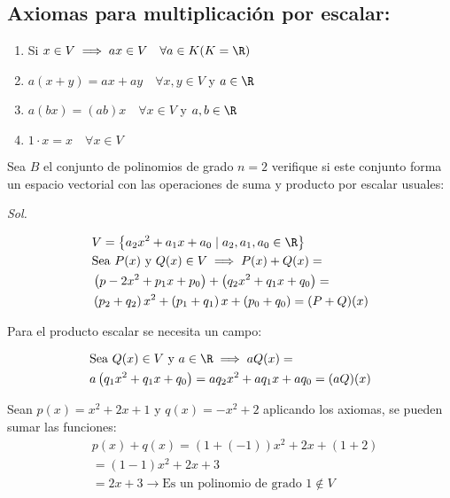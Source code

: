 \subsection{Axiomas para multiplicación por escalar:}

\begin{enumerate}
	\item Si $x\in V\implies ax\in V \quad \forall a\in K (K=\R)$
	\item $a(x+y)=ax+ay\quad \forall x,y\in V$ y $a\in\R$
	\item $a(bx)=(ab)x\quad \forall x\in V$ y $a,b\in \R$
	\item $1\cdot x=x\quad \forall x\in V$
\end{enumerate}

\begin{example}
	Sea $B$ el conjunto de polinomios de grado $n=2$ verifique si este conjunto forma un espacio vectorial con las operaciones de suma y producto por escalar usuales:
\end{example}

\textit{ Sol. }

\begin{align*}
	 & V=\left\{ a_2x^2+a_1x+a_0\mid a_2,a_1,a_0\in\R \right\}                     \\
	 & \text{Sea } P(x)\text{ y } Q(x)\in V\implies P(x)+Q(x)=                     \\
	 & \left(p-2x^2+p_1x+p_0\right)+\left(q_2x^2+q_1x+q_0\right)=                  \\
	 & \left(p_2+q_2\right)x^2+\left(p_1+q_1\right)x+\left(p_0+q_0\right)=(P+Q)(x)
\end{align*}

Para el producto escalar se necesita un campo:

\begin{align*}
	 & \text{Sea } Q(x)\in V \text{ y } a\in\R\implies aQ(x)=   \\
	 & a\left(q_1x^2+q_1x+q_0\right)=aq_2x^2+aq_1x+aq_0=(aQ)(x)
\end{align*}

Sean $p(x)=x^2+2x+1$ y $q(x)=-x^2+2$ aplicando los axiomas, se pueden sumar las funciones:
\begin{align*}
	 & p(x)+q(x)=(1+(-1))x^2+2x+(1+2)                     \\
	 & =(1-1)x^2+2x+3                                     \\
	 & =2x+3\to \text{Es un polinomio de grado 1}\notin V
\end{align*}

